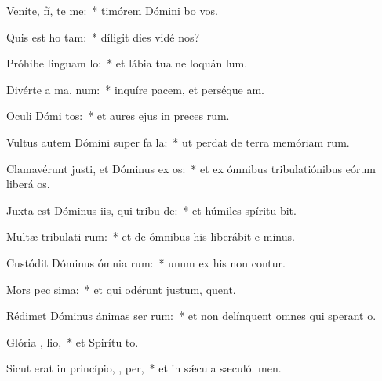 \item Veníte, fí, te me:~* timórem Dómini bo vos.
\item Quis est ho   tam:~* díligit dies vidé nos?
\item Próhibe linguam   lo:~* et lábia tua ne loquán lum.
\item Divérte a ma,   num:~* inquíre pacem, et perséque am.
\item Oculi Dómi  tos:~* et aures ejus in preces rum.
\item Vultus autem Dómini super fa la:~* ut perdat de terra memóriam rum.
\item Clamavérunt justi, et Dóminus ex os:~* et ex ómnibus tribulatiónibus eórum liberá os.
\item Juxta est Dóminus iis, qui tribu  de:~* et húmiles spíritu bit.
\item Multæ tribulati rum:~* et de ómnibus his liberábit e minus.
\item Custódit Dóminus ómnia  rum:~* unum ex his non contur.
\item Mors pec sima:~* et qui odérunt justum, quent.
\item Rédimet Dóminus ánimas ser rum:~* et non delínquent omnes qui sperant  o.
\item Glória ,  lio,~* et Spirítu to.
\item Sicut erat in princípio,  ,  per,~* et in sǽcula sæculó. men.
